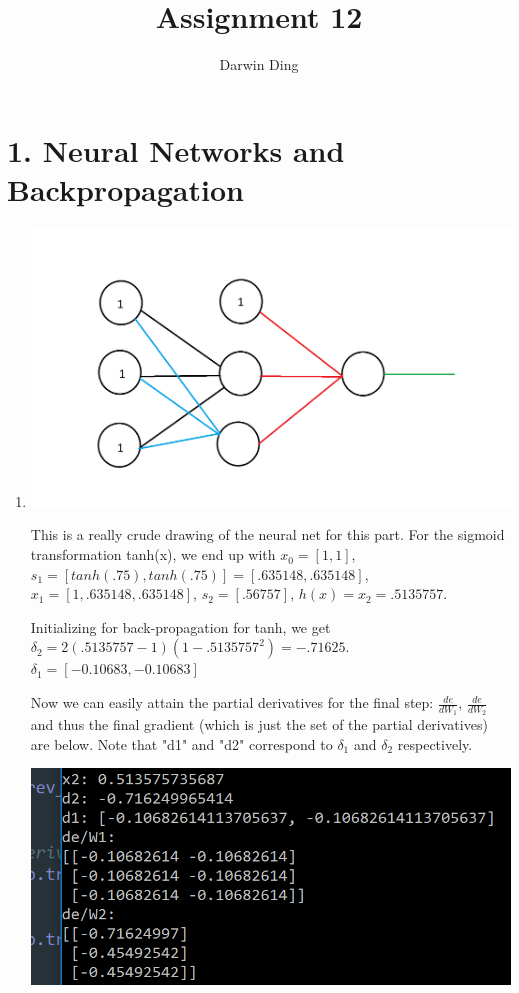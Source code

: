 \documentclass[12pt]{article}
\begin{document}
\title{Assignment 12}
\author{Darwin Ding}
\maketitle

\section*{1. Neural Networks and Backpropagation}
\begin{enumerate}[label=(\alph*)]
	\item \includegraphics[scale=0.6]{1a.png}
	
	This is a really crude drawing of the neural net for this part. For the sigmoid transformation tanh(x), we end up with $x_0 = [1,1]$, $s_1 = [tanh(.75), tanh(.75)] = [.635148, .635148]$, $x_1 = [1, .635148, .635148]$, $s_2 = [.56757]$, $h(x) = x_2 = \boldsymbol{.5135757}$.
	
	Initializing for back-propagation for tanh, we get $\delta_2 = 2(.5135757 - 1)(1 - .5135757^2) = \boldsymbol{-.71625}$. $\delta_1 = \boldsymbol{[-0.10683, -0.10683]}$
	
	Now we can easily attain the partial derivatives for the final step:
	$\frac{de}{dW_1}$, $\frac{de}{dW_2}$ and thus the final gradient (which is just the set of the partial derivatives) are below. Note that "d1" and "d2" correspond to $\delta_1$ and $\delta_2$ respectively.
	
	\includegraphics{1a2.png}
	

\end{enumerate}
\end{document}
